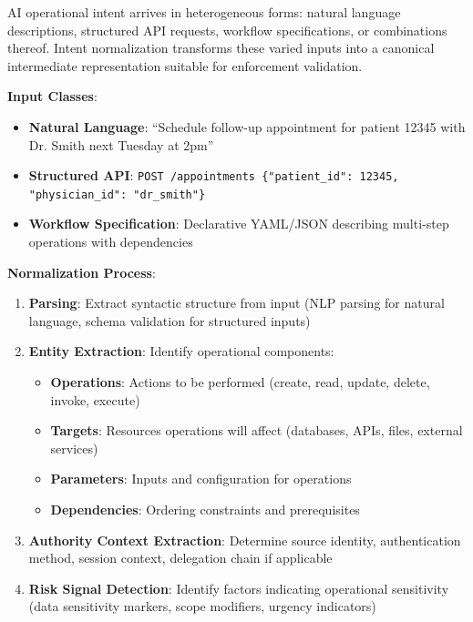 \documentclass[11pt,letterpaper]{article}
\begin{document}
AI operational intent arrives in heterogeneous forms: natural language descriptions, structured API requests, workflow specifications, or combinations thereof. Intent normalization transforms these varied inputs into a canonical intermediate representation suitable for enforcement validation.

\textbf{Input Classes}:

\begin{itemize}
\item \textbf{Natural Language}: ``Schedule follow-up appointment for patient 12345 with Dr. Smith next Tuesday at 2pm''
\item \textbf{Structured API}: \texttt{POST /appointments \{"patient\_id": 12345, "physician\_id": "dr\_smith"\}}
\item \textbf{Workflow Specification}: Declarative YAML/JSON describing multi-step operations with dependencies
\end{itemize}

\textbf{Normalization Process}:

\begin{enumerate}
\item \textbf{Parsing}: Extract syntactic structure from input (NLP parsing for natural language, schema validation for structured inputs)

\item \textbf{Entity Extraction}: Identify operational components:
   \begin{itemize}
   \item \textbf{Operations}: Actions to be performed (create, read, update, delete, invoke, execute)
   \item \textbf{Targets}: Resources operations will affect (databases, APIs, files, external services)
   \item \textbf{Parameters}: Inputs and configuration for operations
   \item \textbf{Dependencies}: Ordering constraints and prerequisites
   \end{itemize}

\item \textbf{Authority Context Extraction}: Determine source identity, authentication method, session context, delegation chain if applicable

\item \textbf{Risk Signal Detection}: Identify factors indicating operational sensitivity (data sensitivity markers, scope modifiers, urgency indicators)
\end{enumerate}
\end{document}
